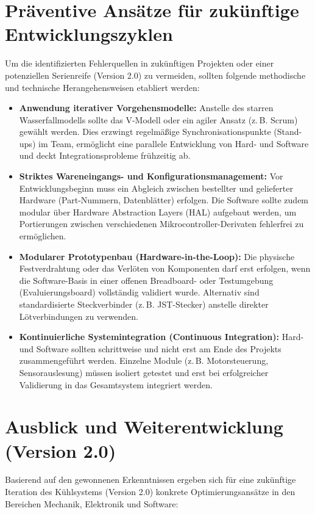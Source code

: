 \section{Präventive Ansätze für zukünftige Entwicklungszyklen}
Um die identifizierten Fehlerquellen in zukünftigen Projekten oder einer potenziellen Serienreife (Version 2.0) zu vermeiden, sollten folgende methodische und technische Herangehensweisen etabliert werden:

\begin{itemize}
	\item \textbf{Anwendung iterativer Vorgehensmodelle:} Anstelle des starren Wasserfallmodells sollte das V-Modell oder ein agiler Ansatz (z.\,B. Scrum) gewählt werden. Dies erzwingt regelmäßige Synchronisationspunkte (Stand-ups) im Team, ermöglicht eine parallele Entwicklung von Hard- und Software und deckt Integrationsprobleme frühzeitig ab.
	\item \textbf{Striktes Wareneingangs- und Konfigurationsmanagement:} Vor Entwicklungsbeginn muss ein Abgleich zwischen bestellter und gelieferter Hardware (Part-Nummern, Datenblätter) erfolgen. Die Software sollte zudem modular über Hardware Abstraction Layers (HAL) aufgebaut werden, um Portierungen zwischen verschiedenen Mikrocontroller-Derivaten fehlerfrei zu ermöglichen.
	\item \textbf{Modularer Prototypenbau (Hardware-in-the-Loop):} Die physische Festverdrahtung oder das Verlöten von Komponenten darf erst erfolgen, wenn die Software-Basis in einer offenen Breadboard- oder Testumgebung (Evaluierungsboard) vollständig validiert wurde. Alternativ sind standardisierte Steckverbinder (z.\,B. JST-Stecker) anstelle direkter Lötverbindungen zu verwenden.
	\item \textbf{Kontinuierliche Systemintegration (Continuous Integration):} Hard- und Software sollten schrittweise und nicht erst am Ende des Projekts zusammengeführt werden. Einzelne Module (z.\,B. Motorsteuerung, Sensorauslesung) müssen isoliert getestet und erst bei erfolgreicher Validierung in das Gesamtsystem integriert werden.
\end{itemize}

\section{Ausblick und Weiterentwicklung (Version 2.0)}
Basierend auf den gewonnenen Erkenntnissen ergeben sich für eine zukünftige Iteration des Kühlsystems (Version 2.0) konkrete Optimierungsansätze in den Bereichen Mechanik, Elektronik und Software:

